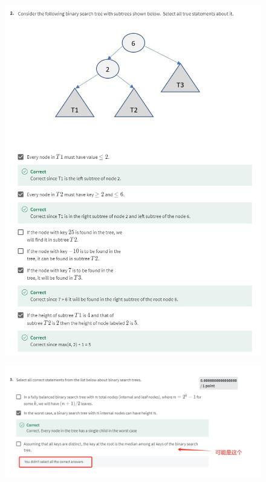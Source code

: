\documentclass{article}
\begin{document}
\begin{figure}[H]
    \includegraphics[width=\textwidth]{binarysearchtreequiz02.png}
\end{figure}

\begin{figure}[H]
    \includegraphics[width=\textwidth]{binarysearchtreequiz03.png}
\end{figure}
\end{document}
